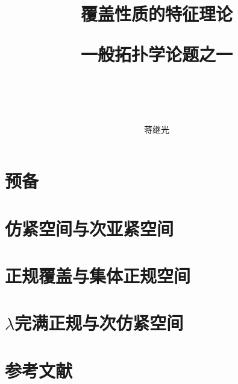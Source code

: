 \documentclass[zihao=-4,heading=true,a4paper,twoside,openany]{ctexbook}
\title{
覆盖性质的特征理论\\
	\begin{kaishu}一般拓扑学论题之一\end{kaishu}\\
}
\author{\kaishu 蒋继光}
\date{}
\begin{document}
\begin{titlepage}
	\maketitle
\end{titlepage}

\setcounter{page}{5}%
{}
\tableofcontents

\mainmatter
{}


\chapter{预备}\label{chap:1}




\chapter{仿紧空间与次亚紧空间}\label{chap2}




\chapter{正规覆盖与集体正规空间}\label{chap3}



\chapter{$\lambda$完满正规与次仿紧空间}\label{chap4}


\newpage


\chapter{参考文献}\label{references}
  



\backmatter

\printbibliography

\begin{small}
	\thispagestyle{empty}
	\onecolumn
	\printindex
\end{small}
\vfill
\eject
\end{document}
